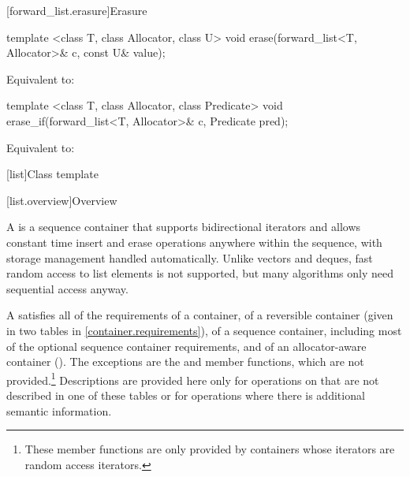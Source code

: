 [forward_list.erasure]{Erasure}

%
\begin{itemdecl}
template <class T, class Allocator, class U>
  void erase(forward_list<T, Allocator>& c, const U& value);
\end{itemdecl}

\begin{itemdescr}
\pnum
\effects
Equivalent to: 
\end{itemdescr}

%
\begin{itemdecl}
template <class T, class Allocator, class Predicate>
  void erase_if(forward_list<T, Allocator>& c, Predicate pred);
\end{itemdecl}

\begin{itemdescr}
\pnum
\effects
Equivalent to: 
\end{itemdescr}

[list]{Class template }

[list.overview]{Overview}

\pnum
{}%
A
is a sequence container that supports
bidirectional iterators and allows constant time insert and erase
operations anywhere within the sequence, with storage management handled
automatically. Unlike vectors and deques,
fast random access to list elements is not supported, but many
algorithms only need sequential access anyway.

\pnum
A  satisfies all of the requirements of a container, of
a reversible container (given in two tables in
\ref{container.requirements}), of a sequence container,
including most of the optional sequence container
requirements, and of an allocator-aware container
().
The exceptions are the
and
member functions, which are not provided.\footnote{These member functions
are only provided by containers whose iterators
are random access iterators.
}
Descriptions are provided here only for operations on
that are not described in one of these tables
or for operations where there is additional semantic information.

